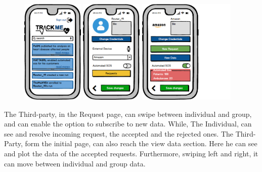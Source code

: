 \documentclass[a4paper]{article}
\begin{document}
\begin{figure}[!htpb]
    	\centering
    	\includegraphics[height=50mm]{images/mockups/HomePage.png}
    	\includegraphics[height=50mm]{images/mockups/IndividualProfile.png}
    	\includegraphics[height=50mm]{images/mockups/ThirdPartyProfile.png}
        \end{figure}

\newpage

The Third-party, in the Request page, can swipe between individual and group, and can enable the option to subscribe to new data. 
\newline
While, The Individual, can see and resolve incoming request, the accepted and the rejected ones.
\newline
The Third- Party, form the initial page, can also reach the view data section. Here he can see and plot the data of the accepted requests. Furthermore, swiping left and right, it can move between individual and group data.
\end{document}
